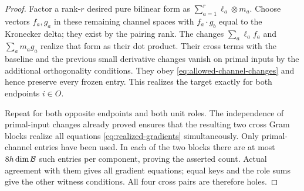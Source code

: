 \begin{proof}
Factor a rank-$r$ desired pure bilinear form as
$\sum_{a=1}^r\ell_a\otimes m_a$.  Choose vectors $f_a,g_a$
in these remaining channel spaces with $f_a\cdot g_b$ equal
to the Kronecker delta; they exist by the pairing rank.
The changes $\sum_a\ell_af_a$ and $\sum_am_ag_a$ realize
that form as their dot product.  Their cross terms with the
baseline and the previous small derivative changes vanish
on primal inputs by the additional orthogonality conditions.
They obey \eqref{eq:allowed-channel-changes} and hence
preserve every frozen entry.  This realizes the target
exactly for both endpoints $i\in O$.

Repeat for both opposite endpoints and both unit roles.
The independence of primal-input changes already proved
ensures that the resulting two cross Gram blocks realize
all equations \eqref{eq:realized-gradients} simultaneously.
Only primal-channel entries have been used.  In each of the
two blocks there are at most $8h\dim\mathcal B$ such entries per
component, proving the asserted count.  Actual agreement
with them gives all gradient equations; equal keys and the
role sums give the other witness conditions.  All four
cross pairs are therefore holes.
\end{proof}
